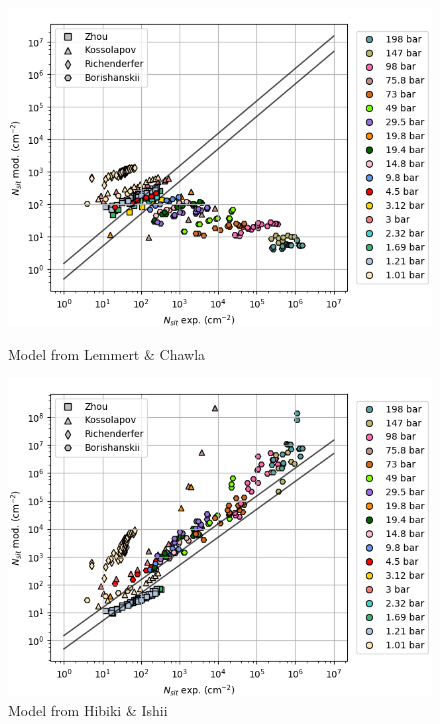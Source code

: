 \begin{figure}[h!]
\begin{multicols}{2}
\includegraphics[width=1.0\linewidth]{img/NSD/LC.png}
\caption{Model from Lemmert \& Chawla}

\includegraphics[width=1.0\linewidth]{img/NSD/HI_rtheta.png}
\caption{Model from Hibiki \& Ishii}
\end{multicols}
\end{figure}

